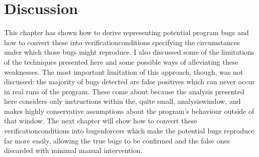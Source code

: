 \section{Discussion}

This chapter has shown how to derive {\StateMachines} representing
potential program bugs and how to convert these into
\glspl{verificationcondition} specifying the circumstances under which
those bugs might reproduce.  I also discussed some of the limitations
of the techniques presented here and some possible ways of alleviating
these weaknesses.  The most important limitation of this approach,
though, was not discussed: the majority of bugs detected are false
positives which can never occur in real runs of the program.  These
come about because the {\StateMachine} analysis presented here
considers only instructions within the, quite small,
\gls{analysiswindow}, and makes highly conservative assumptions about
the program's behaviour outside of that window.  The next chapter will
show how to convert these \glspl{verificationcondition} into
\glspl{bugenforcer} which make the potential bugs reproduce far more
easily, allowing the true bugs to be confirmed and the false ones
discarded with minimal manual intervention.
